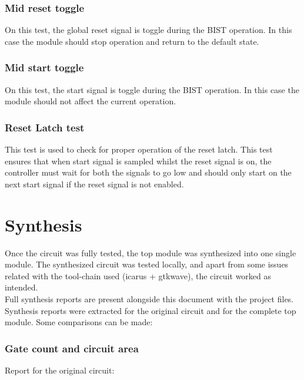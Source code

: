 \documentclass[12pt]{article}
\begin{document}
    \subsubsection*{Mid reset toggle}
    
    On this test, the global reset signal is toggle during the BIST operation. In this case the module should stop operation and return to the default state.
    
    \subsubsection*{Mid start toggle}
    
    On this test, the start signal is toggle during the BIST operation. In this case the module should not affect the current operation.
    
    \subsubsection*{Reset Latch test}
    
    This test is used to check for proper operation of the reset latch. This test ensures that when start signal is sampled whilst the reset signal is on, the controller must wait for both the signals to go low and should only start on the next start signal if the reset signal is not enabled.

    
    
    \section{Synthesis}
    
    Once the circuit was fully tested, the top module was synthesized into one single module. The synthesized circuit was tested locally, and apart from some issues related with the tool-chain used (icarus + gtkwave), the circuit worked as intended. \\
    Full synthesis reports are present alongside this document with the project files.\\
    Synthesis reports were extracted for the original circuit and for the complete top module. Some comparisons can be made:
    
    \subsubsection*{Gate count and circuit area}
    
Report for the original circuit:
\end{document}

